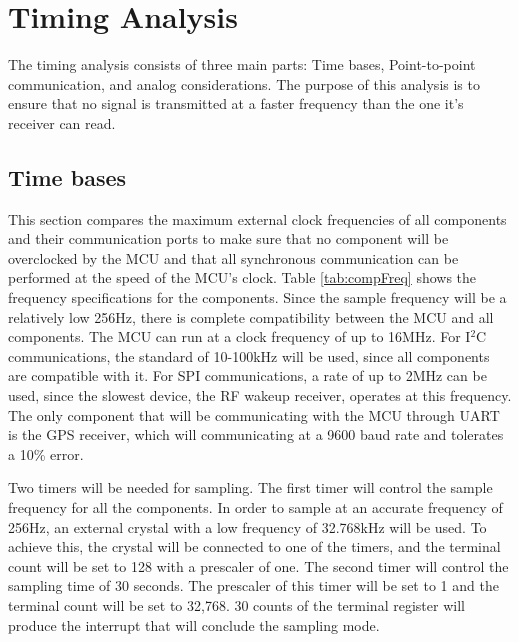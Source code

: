\section{Timing Analysis}
The timing analysis consists of three main parts: Time bases, Point-to-point communication, and analog considerations. The purpose of this analysis is to ensure that no signal is transmitted at a faster frequency than the one it's receiver can read.

\subsection{Time bases}
This section compares the maximum external clock frequencies of all components and their communication ports to make sure that no component will be overclocked by the MCU and that all synchronous communication can be performed at the speed of the MCU's clock. Table \ref{tab:compFreq} shows the frequency specifications for the components.  Since the sample frequency will be a relatively low 256Hz, there is complete compatibility between the MCU and all components. The MCU can run at a clock frequency of up to 16MHz. For I$^2$C communications, the standard of 10-100kHz will be used, since all components are compatible with it. For SPI communications, a rate of up to 2MHz can be used, since the slowest device, the RF wakeup receiver, operates at this frequency. The only component that will be communicating with the MCU through UART is the GPS receiver, which will communicating at a 9600 baud rate and tolerates a 10\% error.

Two timers will be needed for sampling. The first timer will control the sample frequency for all the components.  In order to sample at an accurate frequency of 256Hz, an external crystal with a low frequency of 32.768kHz will be used. To achieve this, the crystal will be connected to one of the timers, and the terminal count will be set to 128 with a prescaler of one. The second timer will control the sampling time of 30 seconds. The prescaler of this timer will be set to 1 and the terminal count will be set to 32,768. 30 counts of the terminal register will produce the interrupt that will conclude the sampling mode.

